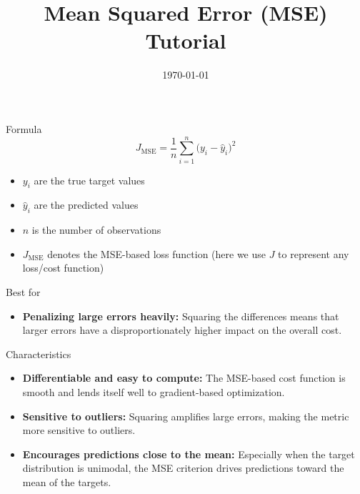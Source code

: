\documentclass{beamer}
\title{Mean Squared Error (MSE) Tutorial}
\author{}
\date{\today}
\begin{document}
\begin{frame}
  \titlepage
\end{frame}

\begin{frame}{Formula}
\[
J_{\text{MSE}} = \frac{1}{n} \sum_{i=1}^{n} \bigl(y_i - \hat{y}_i\bigr)^2
\]

\begin{itemize}
  \item \(y_i\) are the true target values
  \item \(\hat{y}_i\) are the predicted values
  \item \(n\) is the number of observations
  \item \(J_{\text{MSE}}\) denotes the MSE-based loss function (here we use \(J\) to represent any loss/cost function)
\end{itemize}
\end{frame}

\begin{frame}{Best for}
\begin{itemize}
  \item \textbf{Penalizing large errors heavily:} Squaring the differences means that larger errors have a disproportionately higher impact on the overall cost.
\end{itemize}
\end{frame}

\begin{frame}{Characteristics}
\begin{itemize}
  \item \textbf{Differentiable and easy to compute:} The MSE-based cost function is smooth and lends itself well to gradient-based optimization.
  \item \textbf{Sensitive to outliers:} Squaring amplifies large errors, making the metric more sensitive to outliers.
  \item \textbf{Encourages predictions close to the mean:} Especially when the target distribution is unimodal, the MSE criterion drives predictions toward the mean of the targets.
\end{itemize}
\end{frame}
\end{document}
